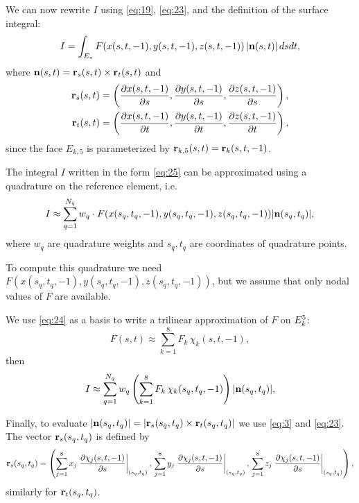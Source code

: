\documentclass[11pt]{article}
\begin{document}
We can now rewrite $I$ using \eqref{eq:19}, \eqref{eq:23}, and the definition of the surface integral:
\begin{equation}
\label{eq:25}
I = \int_{E_{*}} F(x(s,t,-1), y(s,t,-1), z(s,t,-1))\, | \mathbf{n}(s,t) |\,dsdt,
\end{equation}
where $\mathbf{n}(s,t) = \mathbf{r}_{s}(s,t) \times \mathbf{r}_{t}(s,t)$ and
\begin{equation}
\label{eq:26}
\begin{aligned}
\mathbf{r}_{s}(s,t) &= \left(\frac{\partial x(s,t,-1)}{\partial s}, \frac{\partial y(s,t,-1)}{\partial s}, \frac{\partial z(s,t,-1)}{\partial s}\right),\\
\mathbf{r}_{t}(s,t) &= \left(\frac{\partial x(s,t,-1)}{\partial t}, \frac{\partial y(s,t,-1)}{\partial t}, \frac{\partial z(s,t,-1)}{\partial t}\right),
\end{aligned}
\end{equation}
since the face $E_{k,5}$ is parameterized by $\mathbf{r}_{k,5}(s, t) = \mathbf{r}_{k}(s, t, -1)$.

The integral $I$ written in the form \eqref{eq:25} can be approximated
using a quadrature on the reference element, i.e.
\begin{equation}
\label{eq:27}
I \approx \sum_{q=1}^{N_{q}} w_{q}\cdot F(x(s_{q},t_{q},-1), y(s_{q},t_{q},-1), z(s_{q},t_{q},-1)) | \mathbf{n}(s_{q},t_{q}) |,
\end{equation}
where $w_{q}$ are quadrature weights and $s_{q}, t_{q}$ are
coordinates of quadrature points.

To compute this quadrature we need
$F(x(s_{q},t_{q},-1), y(s_{q},t_{q},-1), z(s_{q},t_{q},-1))$, but we
assume that only nodal values of $F$ are available.

We use \eqref{eq:24} as a basis to write a trilinear approximation of $F$ on $E_{k}^{5}$:
\begin{equation}
\label{eq:28}
F(s,t) \approx \sum_{k=1}^{8} F_{k}\,\chi_{k}(s, t, -1),
\end{equation}
then
\begin{equation}
\label{eq:29}
I \approx \sum_{q=1}^{N_{q}} w_{q}\left( \sum_{k=1}^{8} F_{k}\,\chi_{k}(s_{q}, t_{q}, -1) \right) | \mathbf{n}(s_{q},t_{q}) |,
\end{equation}

Finally, to evaluate $|\mathbf{n}(s_{q}, t_{q})| = | \mathbf{r}_{s}(s_{q}, t_{q}) \times
\mathbf{r}_{t}(s_{q}, t_{q}) |$ we use \eqref{eq:3} and \eqref{eq:23}.
The vector $\mathbf{r}_{s}(s_{q}, t_{q})$ is defined by
\begin{equation}
\label{eq:30}
\mathbf{r}_{s}(s_{q},t_{q}) = \left(
  \sum_{j=1}^{8} x_{j} \left.\frac{\partial \chi_{j}(s, t, -1)}{\partial s}\right|_{(s_{q}, t_{q})},\,
  \sum_{j=1}^{8} y_{j} \left.\frac{\partial \chi_{j}(s, t, -1)}{\partial s}\right|_{(s_{q}, t_{q})},\,
  \sum_{j=1}^{8} z_{j} \left.\frac{\partial \chi_{j}(s, t, -1)}{\partial s}\right|_{(s_{q}, t_{q})} \right),
\end{equation}
similarly for $\mathbf{r}_{t}(s_{q}, t_{q})$.
\end{document}
